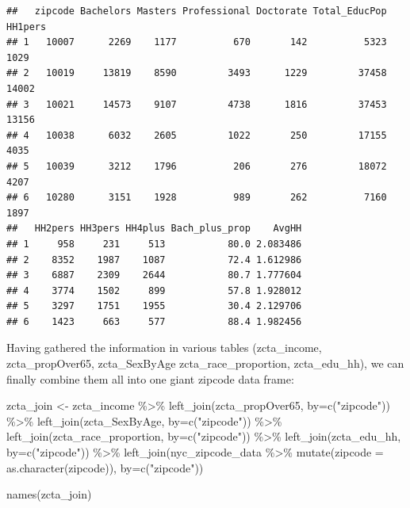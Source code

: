 \documentclass[
  openany]{book}
\newenvironment{Shaded}{\begin{snugshade}}{\end{snugshade}}
\newcommand{\AttributeTok}[1]{\textcolor[rgb]{0.77,0.63,0.00}{#1}}
\newcommand{\FunctionTok}[1]{\textcolor[rgb]{0.00,0.00,0.00}{#1}}
\newcommand{\NormalTok}[1]{#1}
\newcommand{\OtherTok}[1]{\textcolor[rgb]{0.56,0.35,0.01}{#1}}
\newcommand{\SpecialCharTok}[1]{\textcolor[rgb]{0.00,0.00,0.00}{#1}}
\newcommand{\StringTok}[1]{\textcolor[rgb]{0.31,0.60,0.02}{#1}}
\begin{document}
\begin{verbatim}
##   zipcode Bachelors Masters Professional Doctorate Total_EducPop HH1pers
## 1   10007      2269    1177          670       142          5323    1029
## 2   10019     13819    8590         3493      1229         37458   14002
## 3   10021     14573    9107         4738      1816         37453   13156
## 4   10038      6032    2605         1022       250         17155    4035
## 5   10039      3212    1796          206       276         18072    4207
## 6   10280      3151    1928          989       262          7160    1897
##   HH2pers HH3pers HH4plus Bach_plus_prop    AvgHH
## 1     958     231     513           80.0 2.083486
## 2    8352    1987    1087           72.4 1.612986
## 3    6887    2309    2644           80.7 1.777604
## 4    3774    1502     899           57.8 1.928012
## 5    3297    1751    1955           30.4 2.129706
## 6    1423     663     577           88.4 1.982456
\end{verbatim}

Having gathered the information in various tables (zcta\_income, zcta\_propOver65, zcta\_SexByAge
zcta\_race\_proportion, zcta\_edu\_hh), we can finally combine them all into one giant zipcode data frame:

\begin{Shaded}
\begin{Highlighting}[]
\NormalTok{zcta\_join }\OtherTok{\textless{}{-}}\NormalTok{ zcta\_income }\SpecialCharTok{\%\textgreater{}\%}
  \FunctionTok{left\_join}\NormalTok{(zcta\_propOver65, }\AttributeTok{by=}\FunctionTok{c}\NormalTok{(}\StringTok{"zipcode"}\NormalTok{)) }\SpecialCharTok{\%\textgreater{}\%}
  \FunctionTok{left\_join}\NormalTok{(zcta\_SexByAge, }\AttributeTok{by=}\FunctionTok{c}\NormalTok{(}\StringTok{"zipcode"}\NormalTok{)) }\SpecialCharTok{\%\textgreater{}\%}
  \FunctionTok{left\_join}\NormalTok{(zcta\_race\_proportion, }\AttributeTok{by=}\FunctionTok{c}\NormalTok{(}\StringTok{"zipcode"}\NormalTok{)) }\SpecialCharTok{\%\textgreater{}\%}
  \FunctionTok{left\_join}\NormalTok{(zcta\_edu\_hh, }\AttributeTok{by=}\FunctionTok{c}\NormalTok{(}\StringTok{"zipcode"}\NormalTok{)) }\SpecialCharTok{\%\textgreater{}\%}
  \FunctionTok{left\_join}\NormalTok{(nyc\_zipcode\_data }\SpecialCharTok{\%\textgreater{}\%} \FunctionTok{mutate}\NormalTok{(}\AttributeTok{zipcode =} \FunctionTok{as.character}\NormalTok{(zipcode)), }
            \AttributeTok{by=}\FunctionTok{c}\NormalTok{(}\StringTok{"zipcode"}\NormalTok{))}

\FunctionTok{names}\NormalTok{(zcta\_join)}
\end{Highlighting}
\end{Shaded}
\end{document}
